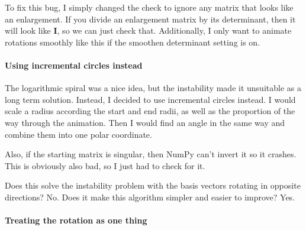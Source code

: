 \documentclass[../development.tex]{subfiles}
\begin{document}
To fix this bug, I simply changed the check to ignore any matrix that looks like an enlargement. If you divide an enlargement matrix by its determinant, then it will look like $\mathbf{I}$, so we can just check that. Additionally, I only want to animate rotations smoothly like this if the smoothen determinant setting is on.


\paragraph{Using incremental circles instead\label{development:making-v0.2.2:animating-rotations:using-incremental-circles-instead}}

The logarithmic spiral was a nice idea, but the instability made it unsuitable as a long term solution. Instead, I decided to use incremental circles instead. I would scale a radius according the start and end radii, as well as the proportion of the way through the animation. Then I would find an angle in the same way and combine them into one polar coordinate.

Also, if the starting matrix is singular, then NumPy can't invert it so it crashes. This is obviously also bad, so I just had to check for it.


Does this solve the instability problem with the basis vectors rotating in opposite directions? No. Does it make this algorithm simpler and easier to improve? Yes.

\paragraph{Treating the rotation as one thing\label{development:making-v0.2.2:animating-rotations:treating-the-rotation-as-one-thing}}
\end{document}
